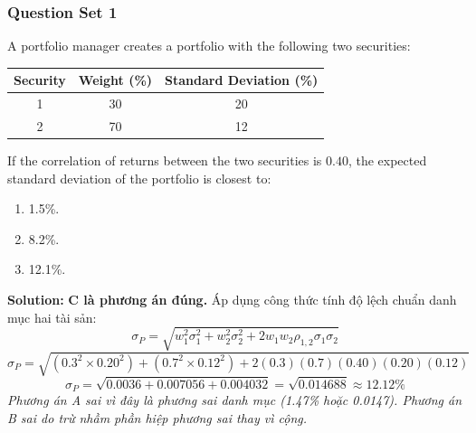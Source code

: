 \subsubsection{Question Set 1}
\label{subsec:app_Question Set 1}

\begin{tcolorbox}[
	colback=gray!5!white,
	colframe=black!15!white,
	boxrule=0.5pt,
	arc=3pt,
	title=\textbf{Question 1},
	coltitle=black,
	colbacktitle=black!5!white,
	before skip=6pt,
	after skip=6pt,
	breakable
]
A portfolio manager creates a portfolio with the following two securities:
\begin{center}
\begin{tabular}{c  c  c}
	\toprule
	\textbf{Security} & \textbf{Weight (\%)} & \textbf{Standard Deviation (\%)} \\
	\midrule
	1 & 30 & 20 \\
	2 & 70 & 12 \\
	\bottomrule
\end{tabular}
\end{center}
If the correlation of returns between the two securities is $0.40$, the expected standard deviation of the portfolio is closest to:
\begin{enumerate}[label=\Alph*.]
	\item 1.5\%.
	\item 8.2\%.
	\item 12.1\%.
\end{enumerate}

\textbf{Solution:}
\textbf{C là phương án đúng.} Áp dụng công thức tính độ lệch chuẩn danh mục hai tài sản:
\[
\sigma_P = \sqrt{w_1^2 \sigma_1^2 + w_2^2 \sigma_2^2 + 2 w_1 w_2 \rho_{1,2} \sigma_1 \sigma_2}
\]
\[
\sigma_P = \sqrt{(0.3^2 \times 0.20^2) + (0.7^2 \times 0.12^2) + 2(0.3)(0.7)(0.40)(0.20)(0.12)}
\]
\[
\sigma_P = \sqrt{0.0036 + 0.007056 + 0.004032} = \sqrt{0.014688} \approx 12.12\%
\]
\textit{Phương án A sai vì đây là phương sai danh mục (1.47\% hoặc 0.0147). Phương án B sai do trừ nhầm phần hiệp phương sai thay vì cộng.}
\end{tcolorbox}

